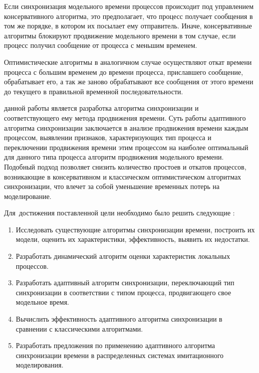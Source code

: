 Если синхронизация модельного времени процессов происходит под управлением консервативного алгоритма, это предполагает, что процесс получает сообщения в том же порядке, в котором их посылает ему отправитель.
Иначе, консервативные алгоритмы блокируют продвижение модельного времени в том случае, если процесс получил сообщение от процесса с меньшим временем.

Оптимистические алгоритмы в аналогичном случае осуществляют откат времени процесса с большим временем до времени процесса, приславшего сообщение, обрабатывает его, а так же заново обрабатывают все сообщения от этого времени до текущего в правильной временной последовательности.




{\aim} данной работы является разработка  алгоритма синхронизации и соответствующего ему метода продвижения времени. Суть работы адаптивного алгоритма синхронизации заключается в анализе продвижения времени каждым процессом, выявлении признаков, характеризующих тип процесса и переключении продвижения времени этим процессом на наиболее оптимальный для данного типа процесса алгоритм продвижения модельного времени. Подобный подход позволяет снизить количество простоев и откатов процессов, возникающие в консервативном и классическом оптимистическом алгоритмах синхронизации, что влечет за собой уменьшение временных потерь на моделирование.


Для~достижения поставленной цели необходимо было решить следующие {\tasks}:
\begin{enumerate}
    \item Исследовать существующие алгоритмы синхронизации времени, построить их модели, оценить их характеристики, эффективность, выявить их недостатки.
  \item Разработать динамический алгоритм оценки характеристик локальных процессов.
  \item Разработать адаптивный алгоритм синхронизации, переключающий тип синхронизации в соответствии с типом процесса, продвигающего свое модельное время.
  \item Вычислить эффективность адаптивного алгоритма синхронизации в сравнении с классическими алгоритмами.
  \item Разработать предложения по применению адаптивного алгоритма синхронизации времени в распределенных системах имитационного моделирования.
\end{enumerate}


